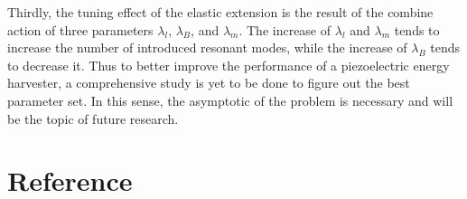 \documentclass{elsarticle}
\begin{document}
Thirdly, the tuning effect of the elastic extension is the result of the combine action of three parameters $\lambda_l$, $\lambda_B$, and $\lambda_m$. The increase of $\lambda_l$ and $\lambda_m$ tends to increase the number of introduced resonant modes, while the increase of $\lambda_B$ tends to decrease it. Thus to better improve the performance of a piezoelectric energy harvester, a comprehensive study is yet to be done to figure out the best parameter set. In this sense, the asymptotic of the problem is necessary and will be the topic of future research. 

\section*{Reference}



\end{document}
